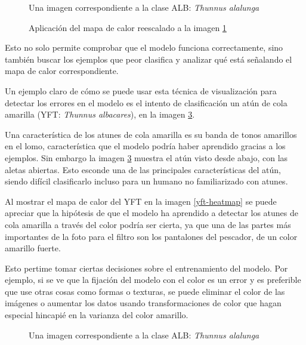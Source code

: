 \begin{figure}
    \caption{Una imagen correspondiente a la clase ALB: \textit{Thunnus alalunga}}
\label{fc-fish}
\end{figure}

\begin{figure}
    \caption{Aplicación del mapa de calor reescalado a la imagen \ref{fc-fish}}
\label{fc-heatmap}
\end{figure}

Esto no solo permite comprobar que el modelo funciona correctamente, sino también buscar los ejemplos que peor clasifica y analizar qué está señalando el mapa de calor correspondiente.

Un ejemplo claro de cómo se puede usar esta técnica de visualización para detectar los errores en el modelo es el intento de clasificación un atún de cola amarilla (YFT: \textit{Thunnus albacares}), en la imagen \ref{yft}.

Una característica de los atunes de cola amarilla es su banda de tonos amarillos en el lomo, característica que el modelo podría haber aprendido gracias a los ejemplos. Sin embargo la imagen \ref{yft} muestra el atún visto desde abajo, con las aletas abiertas. Esto esconde una de las principales características del atún, siendo difícil clasificarlo incluso para un humano no familiarizado con atunes.

Al mostrar el mapa de calor del YFT en la imagen \ref{yft-heatmap} se puede apreciar que la hipótesis de que el modelo ha aprendido a detectar los atunes de cola amarilla a través del color podría ser cierta, ya que una de las partes más importantes de la foto para el filtro son los pantalones del pescador, de un color amarillo fuerte.

Esto pertime tomar ciertas decisiones sobre el entrenamiento del modelo. Por ejemplo, si se ve que la fijación del modelo con el color es un error y es preferible que use otras cosas como formas o texturas, se puede eliminar el color de las imágenes o aumentar los datos usando transformaciones de color que hagan especial hincapié en la varianza del color amarillo.

\begin{figure}
    \caption{Una imagen correspondiente a la clase ALB: \textit{Thunnus alalunga}}
\label{yft}
\end{figure}

